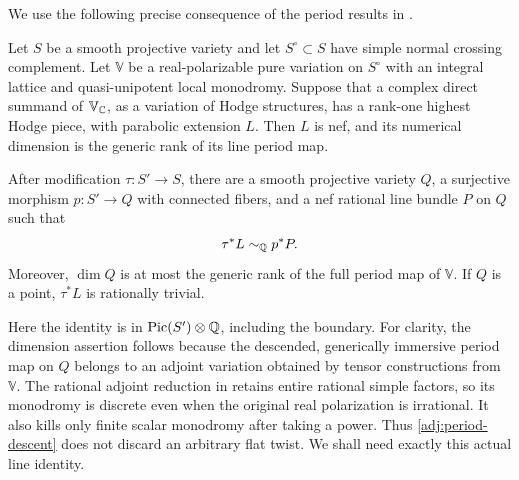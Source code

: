 We use the following precise consequence of the period results in
\cite[Lemmas~4.1 and~4.3 and Proposition~4.5]{LI}.

\begin{lemma}
\label{adj:period-input}
Let $S$ be a smooth projective variety and let $S^\circ\subset S$ have simple
normal crossing complement.  Let $\mathbb V$ be a real-polarizable pure
variation on $S^\circ$ with an integral lattice and quasi-unipotent local
monodromy.  Suppose that a complex direct summand of $\mathbb V_{\mathbb C}$, as a
variation of Hodge structures, has a rank-one highest Hodge piece, with parabolic extension $L$.  Then $L$ is nef,
and its numerical dimension is the generic rank of its line period map.

After modification $\tau:S'\to S$, there are a smooth projective variety
$Q$, a surjective morphism $p:S'\to Q$ with connected fibers, and a nef
rational line bundle $P$ on $Q$ such that
\begin{equation}
\label{adj:period-descent}
                         \tau^*L\sim_{\mathbb Q} p^*P.
\end{equation}
Moreover, $\dim Q$ is at most the generic rank of the full period map of
$\mathbb V$.  If $Q$ is a point, $\tau^*L$ is rationally trivial.
\end{lemma}

Here the identity is in $\operatorname{Pic}(S')\otimes\mathbb Q$, including the boundary.
For clarity, the dimension assertion follows because the descended,
generically immersive period map on $Q$ belongs to an adjoint variation
obtained by tensor constructions from $\mathbb V$.
The rational adjoint reduction in \cite[Lemma~4.3]{LI} retains entire
rational simple factors, so its monodromy is discrete even when the
original real polarization is irrational.  It also kills only finite
scalar monodromy after taking a power.  Thus
\eqref{adj:period-descent} does not discard an arbitrary flat twist.
We shall need exactly this actual line identity.

